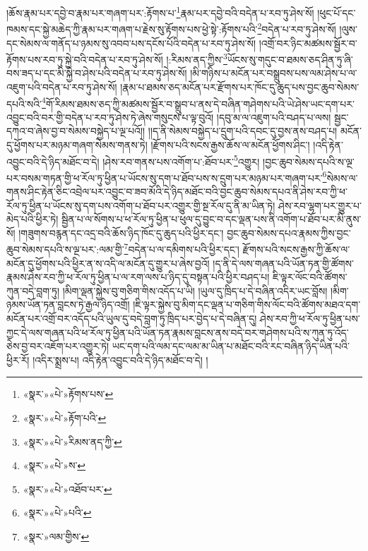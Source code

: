 །ཆོས་རྣམ་པར་དབྱེ་བ་རྣམ་པར་གཞག་པར་:རྟོགས་པ་\footnote{«སྣར་»«པེ་»རྟོགས་པས་}རྣམ་པར་དབྱེ་བའི་བདེན་པ་རབ་ཏུ་ཤེས་སོ། །ཕུང་པོ་དང་ཁམས་དང་སྐྱེ་མཆེད་ཀྱི་རྣམ་པར་གཞག་པ་རྗེས་སུ་རྟོགས་པས་ཕྱེ་སྟེ་:རྟོགས་པའི་\footnote{«སྣར་»«པེ་»རྟོག་པའི་}བདེན་པ་རབ་ཏུ་ཤེས་སོ། །ལུས་དང་སེམས་ལ་གནོད་པ་ཉམས་སུ་འབབ་པས་དངོས་པོའི་བདེན་པ་རབ་ཏུ་ཤེས་སོ། །འགྲོ་བར་ཉིང་མཚམས་སྦྱོར་བ་རྟོགས་པས་རབ་ཏུ་སྐྱེ་བའི་བདེན་པ་རབ་ཏུ་ཤེས་སོ། །:རིམས་ནད་ཀྱིས་\footnote{«སྣར་»«པེ་»རིམས་ནད་ཀྱི་}ཡོངས་སུ་གདུང་བ་ཐམས་ཅད་ཤིན་ཏུ་ཞི་བས་ཟད་པ་དང་མི་སྐྱེ་བ་ཤེས་པའི་བདེན་པ་རབ་ཏུ་ཤེས་སོ། །མི་གཉིས་པ་མངོན་པར་བསྒྲུབས་པས་ལམ་ཤེས་པ་ལ་འཇུག་པའི་བདེན་པ་རབ་ཏུ་ཤེས་སོ། །རྣམ་པ་ཐམས་ཅད་མངོན་པར་རྫོགས་པར་ཁོང་དུ་ཆུད་པས་བྱང་ཆུབ་སེམས་དཔའི་སའི་\footnote{«སྣར་»«པེ་»ས་}གོ་རིམས་ཐམས་ཅད་ཀྱི་མཚམས་སྦྱོར་བ་སྒྲུབ་པ་ནས་དེ་བཞིན་གཤེགས་པའི་ཡེ་ཤེས་ཡང་དག་པར་འབྱུང་བའི་བར་གྱི་བདེན་པ་རབ་ཏུ་ཤེས་ཏེ་ཞེས་གསུངས་པ་ལྟ་བུའོ། །དབུ་མ་ལ་འཇུག་པའི་བཤད་པ་ལས། སྦྱང་དཀའ་བ་ཞེས་བྱ་བ་སེམས་བསྐྱེད་པ་ལྔ་པའོ།། །།ད་ནི་སེམས་བསྐྱེད་པ་དྲུག་པའི་དབང་དུ་བྱས་ནས་བཤད་པ། མངོན་དུ་ཕྱོགས་པར་མཉམ་གཞག་སེམས་གནས་ཏེ། །རྫོགས་པའི་སངས་རྒྱས་ཆོས་ལ་མངོན་ཕྱོགས་ཤིང་། །འདི་རྟེན་འབྱུང་བའི་དེ་ཉིད་མཐོང་བ་དེ། །ཤེས་རབ་གནས་པས་འགོག་པ་:ཐོབ་པར་\footnote{«སྣར་»«པེ་»འཐོབ་པར་}འགྱུར། །བྱང་ཆུབ་སེམས་དཔའི་ས་ལྔ་པར་བསམ་གཏན་གྱི་ཕ་རོལ་ཏུ་ཕྱིན་པ་ཡོངས་སུ་དག་པ་ཐོབ་པས་ས་དྲུག་པར་མཉམ་པར་གཞག་པར་\footnote{«སྣར་»«པེ་»པའི་}སེམས་ལ་གནས་ཤིང་རྟེན་ཅིང་འབྲེལ་པར་འབྱུང་བ་ཟབ་མོའི་དེ་ཉིད་མཐོང་བའི་བྱང་ཆུབ་སེམས་དཔའ་ནི་ཤེས་རབ་ཀྱི་ཕ་རོལ་ཏུ་ཕྱིན་པ་ཡོངས་སུ་དག་པས་འགོག་པ་ཐོབ་པར་འགྱུར་གྱི་སྔ་རོལ་དུ་ནི་མ་ཡིན་ཏེ། ཤེས་རབ་ལྷག་པར་གྱུར་པ་མེད་པའི་ཕྱིར་ཏེ། སྦྱིན་པ་ལ་སོགས་པ་ཕ་རོལ་ཏུ་ཕྱིན་པ་ཕུལ་དུ་བྱུང་བ་དང་ལྡན་པས་ནི་འགོག་པ་ཐོབ་པར་མི་ནུས་སོ། །གཟུགས་བརྙན་དང་འདྲ་བའི་ཆོས་ཉིད་ཁོང་དུ་ཆུད་པའི་ཕྱིར་དང་། བྱང་ཆུབ་སེམས་དཔའ་རྣམས་ཀྱིས་བྱང་ཆུབ་སེམས་དཔའི་ས་ལྔ་པར་:ལམ་གྱི་\footnote{«སྣར་»ལམ་གྱིས་}བདེན་པ་ལ་དམིགས་པའི་ཕྱིར་དང་། རྫོགས་པའི་སངས་རྒྱས་ཀྱི་ཆོས་ལ་མངོན་དུ་ཕྱོགས་པའི་ཕྱིར་ན་ས་འདི་ལ་མངོན་དུ་གྱུར་པ་ཞེས་བྱའོ། །ད་ནི་དེ་ལས་གཞན་པའི་ཡོན་ཏན་གྱི་ཚོགས་རྣམས་ཤེས་རབ་ཀྱི་ཕ་རོལ་ཏུ་ཕྱིན་པ་ལ་རག་ལས་པ་ཉིད་དུ་བསྟན་པའི་ཕྱིར་བཤད་པ། ཇི་ལྟར་ལོང་བའི་ཚོགས་ཀུན་བདེ་བླག་ཏུ། །མིག་ལྡན་སྐྱེས་བུ་གཅིག་གིས་འདོད་པ་ཡི། །ཡུལ་དུ་ཁྲིད་པ་དེ་བཞིན་འདིར་ཡང་བློས། །མིག་ཉམས་ཡོན་ཏན་བླངས་ཏེ་རྒྱལ་ཉིད་འགྲོ། །ཇི་ལྟར་སྐྱེས་བུ་མིག་དང་ལྡན་པ་གཅིག་གིས་ལོང་བའི་ཚོགས་མཐའ་དག་མངོན་པར་འགྲོ་བར་འདོད་པའི་ཡུལ་དུ་བདེ་བླག་ཏུ་ཁྲིད་པར་བྱེད་པ་དེ་བཞིན་དུ། ཤེས་རབ་ཀྱི་ཕ་རོལ་ཏུ་ཕྱིན་པས་ཀྱང་དེ་ལས་གཞན་པའི་ཕ་རོལ་ཏུ་ཕྱིན་པའི་ཡོན་ཏན་རྣམས་བླངས་ནས་བདེ་བར་གཤེགས་པའི་ས་ཀུན་ཏུ་འོད་ཅེས་བྱ་བར་འཇོག་པར་འགྱུར་ཏེ། ཡང་དག་པའི་ལམ་དང་ལམ་མ་ཡིན་པ་མཐོང་བའི་རང་བཞིན་ཉིད་ཡིན་པའི་ཕྱིར་རོ། །འདིར་སྨྲས་པ། འདི་རྟེན་འབྱུང་བའི་དེ་ཉིད་མཐོང་བ་དེ། །
